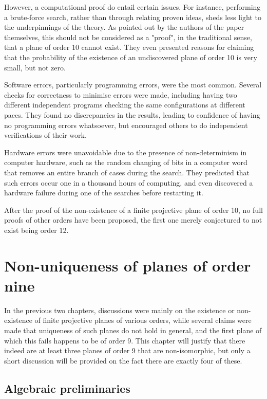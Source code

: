 \documentclass{report}
\theoremstyle{definition}\newtheorem*{definition}{Definition}
\theoremstyle{definition}\newtheorem*{example}{Example}
\theoremstyle{remark}\newtheorem*{remark}{Remark}
\begin{document}
However, a computational proof do entail certain issues. For instance, performing a brute-force search, rather than through relating proven ideas, sheds less light to the underpinnings of the theory. As pointed out by the authors of the paper themselves, this should not be considered as a "proof", in the traditional sense, that a plane of order 10 cannot exist. They even presented reasons for claiming that the probability of the existence of an undiscovered plane of order 10 is very small, but not zero.

Software errors, particularly programming errors, were the most common. Several checks for correctness to minimise errors were made, including having two different independent programs checking the same configurations at different paces. They found no discrepancies in the results, leading to confidence of having no programming errors whatsoever, but encouraged others to do independent verifications of their work.

Hardware errors were unavoidable due to the presence of non-determinism in computer hardware, such as the random changing of bits in a computer word that removes an entire branch of cases during the search. They predicted that such errors occur one in a thousand hours of computing, and even discovered a hardware failure during one of the searches before restarting it.

After the proof of the non-existence of a finite projective plane of order 10, no full proofs of other orders have been proposed, the first one merely conjectured to not exist being order 12.

\chapter{Non-uniqueness of planes of order nine}

In the previous two chapters, discussions were mainly on the existence or non-existence of finite projective planes of various orders, while several claims were made that uniqueness of such planes do not hold in general, and the first plane of which this fails happens to be of order 9. This chapter will justify that there indeed are at least three planes of order 9 that are non-isomorphic, but only a short discussion will be provided on the fact there are exactly four of these.

\section{Algebraic preliminaries}
\end{document}
